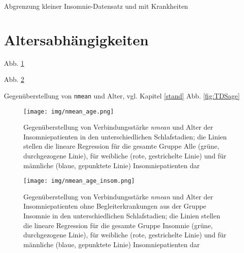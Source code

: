 Abgrenzung kleiner Insomnie-Datensatz und mit Krankheiten\\





\section{Altersabhängigkeiten}



Abb. \ref{fig:nmean_age}

Abb. \ref{fig:nmean_age_insom}

Gegenüberstellung von \texttt{nmean} und Alter, vgl. Kapitel \ref{stand} Abb. \ref{fig:TDSage}








\begin{figure}[H]
	\centering
	\texttt{[image: img/nmean\_age.png]}
	\caption[Gegenüberstellung von Verbindungsstärke \textit{nmean} und Alter von Insomniepatienten]{Gegenüberstellung von Verbindungsstärke \textit{nmean} und Alter der Insomniepatienten in den unterschiedlichen Schlafstadien; die Linien stellen die lineare Regression für die gesamte Gruppe Alle (grüne, durchgezogene Linie), für weibliche (rote, gestrichelte Linie) und für männliche (blaue, gepunktete Linie) Insomniepatienten dar}
	\label{fig:nmean_age}
\end{figure}



\begin{figure}[H]
	\centering
	\texttt{[image: img/nmean\_age\_insom.png]}
	\caption[Gegenüberstellung von Verbindungsstärke \textit{nmean} und Alter von Insomniepatienten ohne Begleiterkrankungen]{Gegenüberstellung von Verbindungsstärke \textit{nmean} und Alter der Insomniepatienten ohne Begleiterkrankungen aus der Gruppe Insomnie in den unterschiedlichen Schlafstadien; die Linien stellen die lineare Regression für die gesamte Gruppe Insomnie (grüne, durchgezogene Linie), für weibliche (rote, gestrichelte Linie) und für männliche (blaue, gepunktete Linie) Insomniepatienten dar}
	\label{fig:nmean_age_insom}
\end{figure}


